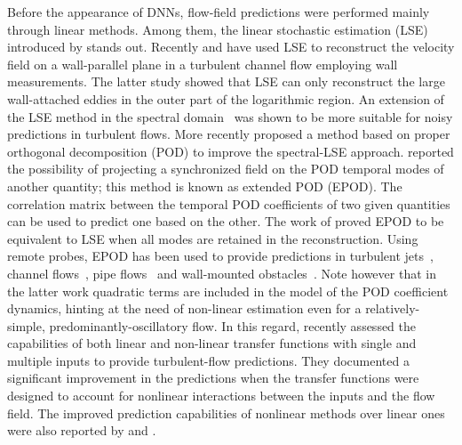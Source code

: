Before the appearance of DNNs, flow-field predictions were performed mainly through linear methods.
Among them, the linear stochastic estimation (LSE) introduced by \citet{adrian1988stochastic} stands out.
Recently \citet{suzuki2017estimation} and \citet{encinar2019logarithmic} have used LSE to reconstruct the velocity field on a wall-parallel plane in a turbulent channel flow employing wall measurements.
The latter study showed that LSE can only reconstruct the large wall-attached eddies in the outer part of the logarithmic region.
An extension of the LSE method in the spectral domain~\citep{tinney2006spectral} was shown to be more suitable for noisy predictions in turbulent flows.
More recently \citet{baars2014proper} proposed a method based on proper orthogonal decomposition (POD) to improve the spectral-LSE approach. \citet{boree2003extended} reported the possibility of projecting a synchronized field on the POD temporal modes of another quantity; this method is known as extended POD (EPOD).
The correlation matrix between the temporal POD coefficients of two given quantities can be used to predict one based on the other.
The work of \citet{boree2003extended} proved EPOD to be equivalent to LSE when all modes are retained in the reconstruction.
Using remote probes, EPOD has been used to provide predictions in turbulent jets~\citep{tinney2008low}, channel flows~\citep{discetti2018estimation}, pipe flows~\citep{discetti2019characterization} and wall-mounted obstacles~\citep{hosseini2016modal, bourgeois2013generalized}.
Note however that in the latter work quadratic terms are included in the model of the POD coefficient dynamics, hinting at the need of non-linear estimation even for a relatively-simple, predominantly-oscillatory flow.
In this regard, \citet{sasaki2019transfer} recently assessed the capabilities of both linear and non-linear transfer functions with single and multiple inputs to provide turbulent-flow predictions.
They documented a significant improvement in the predictions when the transfer functions were designed to account for nonlinear interactions between the inputs and the flow field.
The improved prediction capabilities of nonlinear methods over linear ones were also reported by \citet{mokhasi2009predictive} and \citet{nair2020leveraging}.

